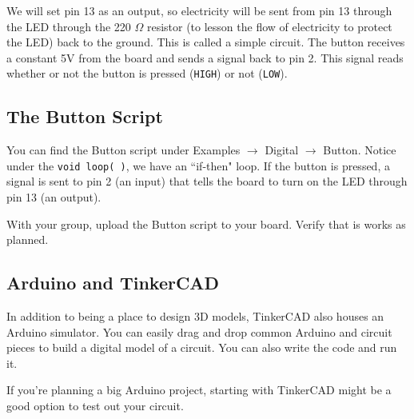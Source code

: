 \noindent We will set pin 13 as an output, so electricity will be sent from pin 13 through the LED through the 220 $\Omega$ resistor (to lesson the flow of electricity to protect the LED) back to the ground. This is called a simple circuit. 
The button receives a constant 5V from the board and sends a signal back to pin 2. This signal reads whether or not the button is pressed (\lstinline$HIGH$) or not (\lstinline$LOW$).

\subsection{The Button Script}

You can find the Button script under Examples $\rightarrow$ Digital $\rightarrow$ Button. Notice under the \lstinline$void loop( )$, we have an ``if-then" loop. If the button is pressed, a signal is sent to pin 2 (an input) that tells the board to turn on the LED through pin 13 (an output).

\begin{exercise}
With your group, upload the Button script to your board. Verify that is works as planned.
\end{exercise}

\subsection{Arduino and TinkerCAD}

In addition to being a place to design 3D models, TinkerCAD also houses an Arduino simulator. You can easily drag and drop common Arduino and circuit pieces to build a digital model of a circuit. You can also write the code and run it.

\noindent If you're planning a big Arduino project, starting with TinkerCAD might be a good option to test out your circuit.


